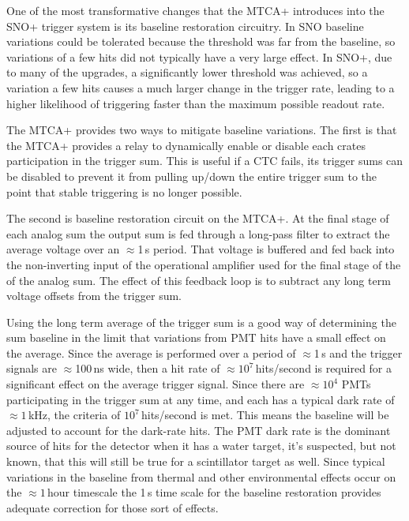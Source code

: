 One of the most transformative changes that the MTCA+ introduces into
the SNO+ trigger system is its baseline restoration circuitry.
In SNO baseline variations could be tolerated because
the threshold was far from the baseline, so variations of a few hits
did not typically have a very large effect.
In SNO+, due to many of the upgrades, a significantly lower threshold was achieved,
so a variation a few hits causes a much larger change in the trigger rate,
leading to a higher likelihood of triggering faster than the  maximum possible
readout rate.

The MTCA+ provides two ways to mitigate baseline variations.
The first is that the MTCA+ provides a relay to dynamically enable or disable each
crates participation in the trigger sum.
This is useful if a CTC fails, its trigger sums can be disabled to prevent it from
pulling up/down the entire trigger sum to the point that stable triggering is no
longer possible.

The second is baseline restoration circuit on the MTCA+. At the final
stage of each analog sum the output sum is fed through a long-pass
filter to extract the average voltage over an $\approx$1\,s period.
That voltage is buffered and fed back into the non-inverting input
of the operational amplifier used for the final stage of the
of the analog sum.
The effect of this feedback loop is to subtract any long term
voltage offsets from the trigger sum.

Using the long term average of the trigger sum is a good way of
determining the sum baseline in the limit that variations from
PMT hits have a small effect on the average.
Since the average is performed over a period of $\approx$1\,s
and the trigger signals are $\approx$100\,ns wide, then a hit
rate of $\approx 10^7$\,hits/second is required for a significant
effect on the average trigger signal.
Since there are $\approx10^4$ PMTs participating in the trigger sum
at any time, and each has a typical dark rate of $\approx1$\,kHz, the
criteria of $10^7$\,hits/second is met.
This means the baseline will be adjusted to account for the dark-rate hits.
The PMT dark rate is the dominant source of hits for the detector when it has
a water target, it's suspected, but not known, that this will still be true for
a scintillator target as well.
Since typical variations in the baseline from thermal and other environmental
effects occur on the $\approx1$\,hour timescale the 1\,s time scale for the
baseline restoration provides adequate correction for those sort of effects.


